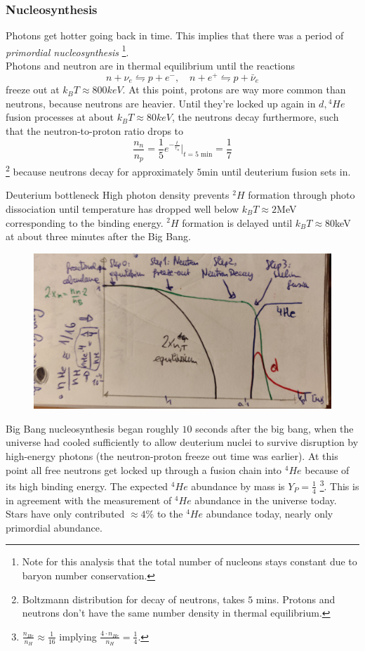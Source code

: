 \subsubsection{Nucleosynthesis}
Photons get hotter going back in time. This implies that there was a period of \emph{primordial nucleosynthesis} 
\footnote{Note for this analysis that the total number of nucleons stays constant due to baryon number conservation.}.\\
Photons and neutron are in thermal equilibrium until the reactions
\begin{equation}
	n+\nu_e \leftrightharpoons p+e^-,\quad n+e^+ \leftrightharpoons p+\bar{\nu}_e
\end{equation}
freeze out at $k_B T\approx 800 keV$. At this point, protons are way more common than neutrons, because neutrons are heavier. Until they're locked up again in $d, {}^4 He$ fusion processes at about $k_B T \approx 80 keV$, the neutrons decay furthermore, such that the neutron-to-proton ratio drops to
\begin{equation}
	\frac{n_n}{n_p}=\frac{1}{5} e^{-\frac{t}{\tau_n}} |_{t=5\text{ min}} = \frac{1}{7}
\end{equation}\footnote{Boltzmann distribution for decay of neutrons, takes $5$ mins. Protons and neutrons don't have the same number density in thermal equilibrium.}
because neutrons decay for approximately $5$min until deuterium fusion sets in.
\begin{mybox}{Deuterium bottleneck}
	High photon density prevents ${}^2 H$ formation through photo dissociation until temperature has dropped well below $k_B T \approx 2$MeV corresponding to the binding energy. ${}^2 H$ formation is delayed until $k_B T\approx 80$keV at about three minutes after the Big Bang.
\end{mybox}
\begin{figure}[h!]
	\centering
	\includegraphics[width=0.5\linewidth]{gfx/nucleosynthesis}
	\caption{}
	\label{fig:nucleosynthesis}
\end{figure}
Big Bang nucleosynthesis began roughly $10$ seconds after the big bang, when the universe had cooled sufficiently to allow deuterium nuclei to survive disruption by high-energy photons (the neutron-proton freeze out time was earlier). At this point all free neutrons get locked up through a fusion chain into ${}^4 He$ because of its high binding energy. The expected ${}^4 He$ abundance by mass is $Y_P = \frac{1}{4}$ \footnote{$\frac{n_{He}}{n_H} \approx \frac{1}{16}$ implying $\frac{4 \cdot n_{He}}{n_H} = \frac{1}{4}$.}. This is in agreement with the measurement of ${}^4 He$ abundance in the universe today. Stars have only contributed $\approx 4\%$ to the ${}^4 He$ abundance today, nearly only primordial abundance.\\
